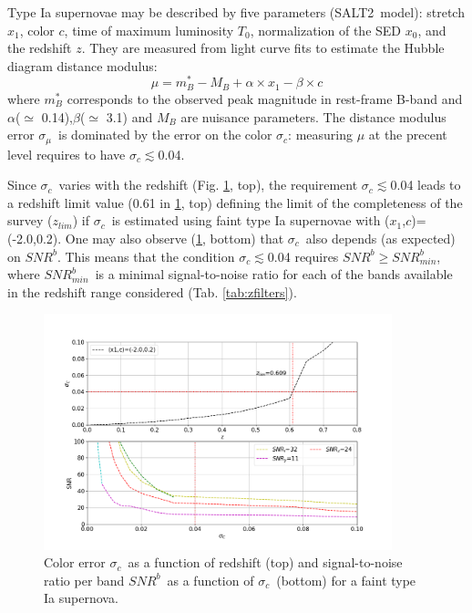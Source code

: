 \documentclass[\docopts]{\docclass}
\newcommand{\snrb}{\mbox{$SNR^b$}}
\newcommand{\snrbmin}{\mbox{$SNR^b_{min}$}}
\newcommand{\z}{{$z$}}
\newcommand{\salt}{SALT2}
\newcommand{\xnorm}{$x_0$}
\newcommand{\strech}{$x_1$}
\newcommand{\col}{$c$}
\newcommand{\daymax}{$T_0$}
\newcommand{\sigc}{\mbox{$\sigma_c$}}
\newcommand{\sigmu}{\mbox{$\sigma_\mu$}}
\newcommand{\zlim}{\mbox{$z_{lim}$}}
\begin{document}
Type Ia supernovae may be described by five parameters (\salt~model): stretch\strech, color \col, time of maximum luminosity \daymax, normalization of the SED \xnorm, and the redshift \z.  They are measured from light curve fits to estimate the Hubble diagram distance modulus:
\begin{equation}
  \mu =m_B^*- M_B+\alpha \times x_1 -\beta \times c \label{eq:mu}
\end{equation}
where $m_B^*$ corresponds to the observed peak magnitude in rest-frame B-band and $\alpha$($\simeq$ 0.14),$\beta$($\simeq$ 3.1) and $M_B$ are nuisance parameters. The distance modulus error \sigmu~is dominated by the error on the color \sigc: measuring $\mu$ at the precent level  requires to have \sigc$\lesssim$0.04.

Since \sigc~varies with the redshift  (Fig. \ref{fig:sigc_z}, top), the requirement \sigc$\lesssim$0.04 leads to a redshift limit value (0.61 in \ref{fig:sigc_z}, top) defining the limit of the completeness of the survey (\zlim) if \sigc~is estimated using faint type Ia supernovae with (\strech,\col)=(-2.0,0.2). One may also observe (\ref{fig:sigc_z}, bottom) that \sigc~also depends (as expected) on \snrb. This means that the condition \sigc$\lesssim$0.04 requires \snrb$\geq$\snrbmin, where \snrbmin~is a minimal signal-to-noise ratio for each of the bands available in the redshift range considered (Tab. \ref{tab:zfilters}).

\begin{figure}[htbp]
\begin{center}
  \includegraphics[width=0.9\textwidth]{sigmaC_z.png}
 \caption{Color error \sigc~as a function of redshift (top) and signal-to-noise ratio per band \snrb~as a function of \sigc~(bottom) for a faint type Ia supernova.}\label{fig:sigc_z}
\end{center}
\end{figure}
\end{document}
